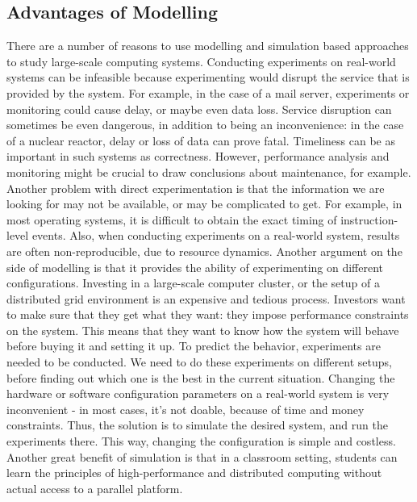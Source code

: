 \subsection{Advantages of Modelling}
There are a number of reasons to use modelling and simulation based
approaches to study large-scale computing systems. Conducting
experiments on real-world systems can be
infeasible because experimenting would disrupt the service that is
provided by the system. For example, in the case of a mail server,
experiments or monitoring could cause delay, or maybe even data
loss. Service disruption can sometimes be even dangerous, in addition
to being an inconvenience: in the case of a nuclear reactor, delay or
loss of data can prove fatal. Timeliness can be as important in such
systems as correctness. However, performance analysis and monitoring
might be crucial to draw conclusions about maintenance, for
example. Another problem with direct experimentation is that the
information we are looking for may not be available, or may be
complicated to get. For example, in most operating systems, it is
difficult to obtain the exact timing of instruction-level
events.\cite{h12_1} Also, when conducting experiments on a real-world
system, results are often non-reproducible, due to resource
dynamics.\cite{clq08} Another argument on the side of modelling is
that it provides the ability of experimenting on different
configurations. Investing in a large-scale computer cluster, or the
setup of a distributed grid environment is an expensive and tedious
process. Investors want to make sure that they get what they
want: they impose performance constraints on the system. This means
that they want to know how the system will behave
before buying it and setting it up. To predict the behavior,
experiments are needed to be conducted. We need to do these
experiments on different setups, before finding out which one is the
best in the current situation. Changing the hardware or software
configuration parameters on a real-world system is very inconvenient -
in most cases, it's not doable, because of time and money
constraints. Thus, the solution is to simulate the desired
system, and run the experiments there. This way, changing the
configuration is simple and costless.\cite{h12_1} Another great
benefit of simulation is that in a classroom setting, students can
learn the principles of high-performance and distributed computing
without actual access to a parallel platform.\cite{csgscq11}
